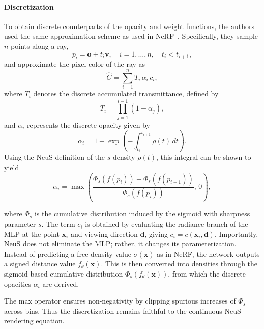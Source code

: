 \begin{enrichment}
\begin{enrichment}
        \paragraph{Discretization} 
        To obtain discrete counterparts of the opacity and weight functions, the authors used the same approximation scheme as used in NeRF~\cite{mildenhall2020_nerf}. 
        Specifically, they sample \(n\) points along a ray, 
        \[
        p_i = \mathbf{o} + t_i \mathbf{v}, \quad i=1,\dots,n, \quad t_i < t_{i+1},
        \]
        and approximate the pixel color of the ray as
        \begin{equation}
            \hat{C} = \sum_{i=1}^{n} T_i \,\alpha_i \, c_i, 
        \end{equation}
        where \(T_i\) denotes the discrete accumulated transmittance, defined by
        \[
        T_i = \prod_{j=1}^{i-1} (1 - \alpha_j),
        \]
        and \(\alpha_i\) represents the discrete opacity given by
        \begin{equation}
            \alpha_i = 1 - \exp\!\left( - \int_{t_i}^{t_{i+1}} \rho(t) \, dt \right). 
        \end{equation}
        Using the NeuS definition of the $s$-density \(\rho(t)\), this integral can be shown to yield
        \begin{equation}
            \alpha_i = \max\!\left( 
            \frac{\Phi_s(f(p_i)) - \Phi_s(f(p_{i+1}))}{\Phi_s(f(p_i))}, \, 0
            \right), 
        \end{equation}
        
        where \(\Phi_s\) is the cumulative distribution induced by the sigmoid with sharpness parameter \(s\).
        The term \(c_i\) is obtained by evaluating the radiance branch of the MLP at the point 
        \(\mathbf{x}_i\) and viewing direction \(\mathbf{d}\), giving \(c_i = c(\mathbf{x}_i,\mathbf{d})\).
        Importantly, NeuS does not eliminate the MLP; rather, it changes its parameterization. 
        Instead of predicting a free density value \(\sigma(\mathbf{x})\) as in NeRF, the network outputs a 
        signed distance value \(f_\theta(\mathbf{x})\). This is then converted into densities through the 
        sigmoid-based cumulative distribution \(\Phi_s(f_\theta(\mathbf{x}))\), from which the discrete 
        opacities \(\alpha_i\) are derived. 
        
        The max operator ensures non-negativity by clipping spurious increases of \(\Phi_s\) across bins. 
        Thus the discretization remains faithful to the continuous NeuS rendering equation.
        

\end{enrichment}
\end{enrichment}
